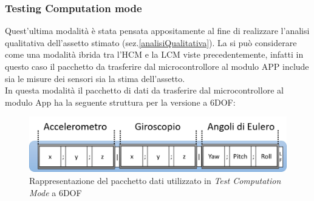\subsubsection{Testing Computation mode}
\label{tcm}
Quest'ultima modalità è stata pensata appositamente al fine di realizzare l'analisi qualitativa dell'assetto stimato (sez.\ref{analisiQualitativa}). La si può considerare come una modalità ibrida tra l'HCM e la LCM viste precedentemente, infatti in questo caso il pacchetto da trasferire dal microcontrollore al modulo APP include sia le misure dei sensori sia la stima dell'assetto.\\
In questa modalità il pacchetto di dati da trasferire dal microcontrollore al modulo App ha la seguente struttura per la versione a 6DOF:
\begin{figure}[H]  
	\centering 
	\includegraphics[scale=0.4]{implementazione/tcm6Foto.png}
	\caption{Rappresentazione del pacchetto dati utilizzato in \textit{Test Computation Mode} a 6DOF}
	\label{fig:tcm6Foto}
\end{figure}

